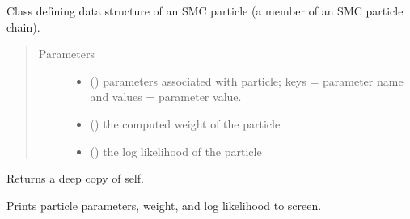 \documentclass[letterpaper,10pt,english]{sphinxmanual}
\begin{document}
\begin{fulllineitems}
\label{\detokenize{source_code:smcpy.particles.particle.Particle}}
Class defining data structure of an SMC particle (a member of an SMC
particle chain).
\begin{quote}\begin{description}
\item[{Parameters}] \leavevmode\begin{itemize}
\item {} 
 () \textendash{} parameters associated with particle; keys = parameter
name and values = parameter value.

\item {} 
 () \textendash{} the computed weight of the particle

\item {} 
 () \textendash{} the log likelihood of the particle

\end{itemize}

\end{description}\end{quote}

\begin{fulllineitems}
\label{\detokenize{source_code:smcpy.particles.particle.Particle.copy}}
Returns a deep copy of self.

\end{fulllineitems}


\begin{fulllineitems}
\label{\detokenize{source_code:smcpy.particles.particle.Particle.print_particle_info}}
Prints particle parameters, weight, and log likelihood to screen.

\end{fulllineitems}


\end{fulllineitems}
\end{document}
